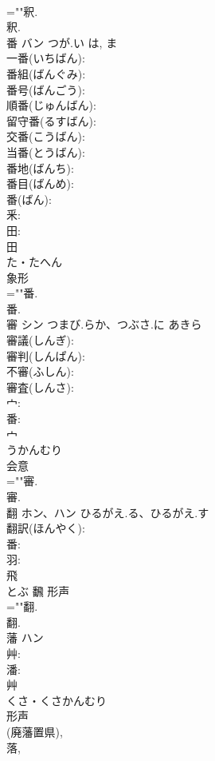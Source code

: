 \documentclass[8pt]{extreport}
\begin{document}
\begin{CJK}{UTF8}{min}
\\	=""釈.
\\	釈.
\\	番	バン	つが.い	は, ま	
\\	一番(いちばん): 
\\	番組(ばんぐみ): 
\\	番号(ばんごう): 
\\	順番(じゅんばん): 
\\	留守番(るすばん): 
\\	交番(こうばん): 
\\	当番(とうばん): 
\\	番地(ばんち): 
\\	番目(ばんめ): 
\\	番(ばん): 
\\	釆: 
\\	田: 
\\	田	
\\	た・たへん	
\\	象形 
\\	=""番.
\\	番.
\\	審	シン	つまび.らか、つぶさ.に	あきら	
\\	審議(しんぎ): 
\\	審判(しんぱん): 
\\	不審(ふしん): 
\\	審査(しんさ): 
\\	宀: 
\\	番: 
\\	宀	
\\	うかんむり	
\\	会意 
\\	=""審.
\\	審.
\\	翻	ホン、ハン	ひるがえ.る、ひるがえ.す		
\\	翻訳(ほんやく): 
\\	番: 
\\	羽: 
\\	飛	
\\	とぶ	飜	形声 
\\	=""翻.
\\	翻.
\\	藩	ハン			
\\	艸: 
\\	潘: 
\\	艸	
\\	くさ・くさかんむり	
\\	形声 
\\	(廃藩置県), 
\\	落, 

\end{CJK}
\end{document}
